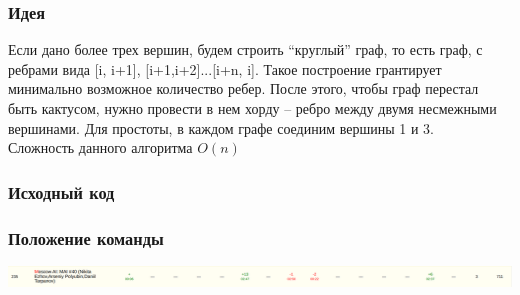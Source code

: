 \documentclass[12pt]{article}
\begin{document}
\subsubsection*{Идея}
Если дано более трех вершин, будем строить “круглый” граф, то есть граф, с ребрами вида [i, i+1], [i+1,i+2]...[i+n, i]. Такое построение 
грантирует минимально возможное количество ребер. После этого, чтобы граф перестал быть кактусом,  нужно провести в нем хорду – ребро между 
двумя несмежными вершинами. Для простоты, в каждом графе соединим вершины 1 и 3.
\\ 
Сложность данного алгоритма $O(n)$
\subsubsection*{Исходный код}

\subsubsection*{Положение команды}
\includegraphics[scale=0.25]{images/QuarterFinal.png}\newline\noindent
\end{document}
